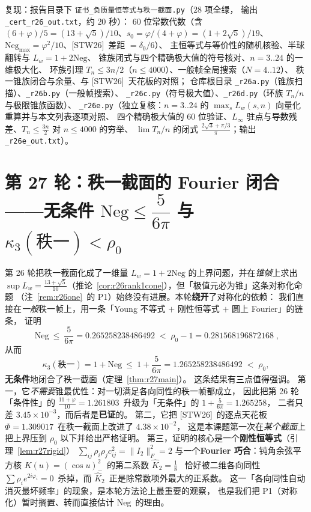 \documentclass[UTF8,11pt]{ctexart}
\theoremstyle{definition}
\newcommand{\STW}{\textup{[STW26]}}
\begin{document}
复现：报告目录下 \texttt{证书\_负质量恒等式与秩一截面.py}（$28$ 项全绿，
输出 \texttt{\_cert\_r26\_out.txt}，约 $20$ 秒）：
$60$ 位常数代数（含 $(6+\varphi)/5=(13+\sqrt5)/10$、$s_0=\varphi/(4+\varphi)=(1+2\sqrt5)/19$、
$\mathrm{Neg}_{\max}=\varphi^2/10$、\STW\ 差距 $=\delta_0/6$）、
主恒等式与等价性的随机核验、半球翻转与 $L_w=1+2\mathrm{Neg}$、
锥族闭式与四个精确极大值的符号核对、$n=3..24$ 的一维极大化、
环族引理 $T_n\le3n/2$（$n\le4000$）、一般帧全局搜索（$N=4..12$）、
秩一锥族闭合与余量、与 \STW\ 天花板的对照；
仓库根目录 \texttt{\_r26a.py}（锥族扫描）、\texttt{\_r26b.py}（一般帧搜索）、
\texttt{\_r26c.py}（符号极大值）、\texttt{\_r26d.py}（环族 $T_n/n$ 与极限锥族函数）、
\texttt{\_r26e.py}（独立复核：$n=3..24$ 的 $\max_sL_w(s,n)$ 向量化重算并与本文列表逐项对照、
四个精确极大值的 $60$ 位验证、$L_\infty$ 驻点与导数残差、$T_n\le\frac{3n}2$ 对 $n\le4000$ 的穷举、
$\lim T_n/n$ 的闭式 $\frac{2\sqrt3+\pi/3}{\pi}$；输出 \texttt{\_r26e\_out.txt}）。

\section{第 27 轮：秩一截面的 Fourier 闭合——无条件 $\mathrm{Neg}\le\dfrac5{6\pi}$ 与 $\kappa_3(\text{秩一})<\rho_0$}\label{sec:r27}

第 26 轮把秩一截面化成了一维量 $L_w=1+2\mathrm{Neg}$ 的上界问题，并在\emph{锥帧}上求出
$\sup L_w=\frac{13+\sqrt5}{10}$（推论~\ref{cor:r26rank1cone}），但「极值元必为锥」这条对称化命题
（注~\ref{rem:r26one}~的 P1）始终没有进展。本轮\textbf{绕开}了对称化的依赖：
我们直接在\emph{一般}秩一帧上，用一条「Young 不等式 $+$ 刚性恒等式 $+$ 圆上 Fourier」的链条，
证明
\begin{equation}\label{eq:r27head}
\boxed{\;\mathrm{Neg}\ \le\ \frac5{6\pi}=0.265258238486492\;<\;\rho_0-1=0.281568196872168\;},
\end{equation}
从而
\begin{equation}\label{eq:r27kappa}
\kappa_3(\text{秩一})=1+\mathrm{Neg}\ \le\ 1+\frac5{6\pi}=1.265258238486492\;<\;\rho_0 ,
\end{equation}
\textbf{无条件}地闭合了秩一截面（定理~\ref{thm:r27main}）。
这条结果有三点值得强调。
第一，它\emph{不需要}锥最优性：对一切满足各向同性的秩一帧都成立，
因此把第 26 轮「条件性」的 $\frac{11+\varphi}{10}=1.261803$~升级为「无条件」的 $1+\frac5{6\pi}=1.265258$，
二者只差 $3.45\times10^{-3}$，而后者是\textbf{已证}的。
第二，它把 \STW\ 的逐点天花板 $\Phi=1.309017$~在秩一截面上改进了 $4.38\times10^{-2}$，
这是本课题第一次在\emph{某个截面}上把上界压到 $\rho_0$ 以下并给出严格证明。
第三，证明的核心是一个\textbf{刚性恒等式}（引理~\ref{lem:r27rigid}）
$\sum_{ij}\rho_i\rho_jc_{ij}^2=\|I_2\|_F^2=2$
与一个\textbf{Fourier 巧合}：钝角余弦平方核 $K(u)=(\cos u)_-^2$~的第二系数 $\widehat K_2=\frac18$~
恰好被二维各向同性 $\sum\rho_ie^{2i\varphi_i}=0$~杀掉，而 $\widehat K_2$~正是除常数项外最大的正系数。
这一「各向同性自动消灭最坏频率」的现象，是本轮方法论上最重要的观察，
也是我们把 P1（对称化）暂时搁置、转而直接估计 $\mathrm{Neg}$~的理由。
\end{document}
